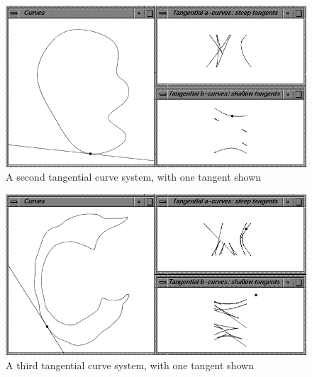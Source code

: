 \documentclass[12pt]{article}
\begin{document}
\begin{figure}
\begin{center}
\includegraphics*[scale=.65]{img/jjduta2.jpg}
\end{center}
\caption{A second tangential curve system, with one tangent shown}
\label{fig:tangcurve2}
\end{figure}

\begin{figure}
\begin{center}
\includegraphics*[scale=.65]{img/jjduta3.jpg}
\end{center}
\caption{A third tangential curve system, with one tangent shown}
\label{fig:tangcurve3}
\end{figure}

\end{document}
